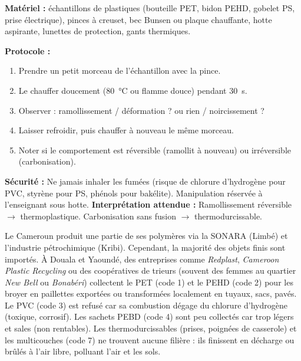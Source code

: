 \documentclass[11pt]{article}
\begin{document}
\begin{experience}
\textbf{Matériel :} échantillons de plastiques (bouteille PET, bidon PEHD, gobelet PS, prise électrique), pinces à creuset, bec Bunsen ou plaque chauffante, hotte aspirante, lunettes de protection, gants thermiques.\par
\textbf{Protocole :}
\begin{enumerate}
\item Prendre un petit morceau de l'échantillon avec la pince.
\item Le chauffer doucement (\SI{80}{\celsius} ou flamme douce) pendant \SI{30}{s}.
\item Observer : ramollissement / déformation ? ou rien / noircissement ?
\item Laisser refroidir, puis chauffer à nouveau le même morceau.
\item Noter si le comportement est réversible (ramollit à nouveau) ou irréversible (carbonisation).
\end{enumerate}
\textbf{Sécurité :} Ne jamais inhaler les fumées (risque de chlorure d'hydrogène pour PVC, styrène pour PS, phénols pour bakélite). Manipulation réservée à l'enseignant sous hotte.
\textbf{Interprétation attendue :} Ramollissement réversible $\rightarrow$ thermoplastique. Carbonisation sans fusion $\rightarrow$ thermodurcissable.
\end{experience}

\begin{savaistu}
Le Cameroun produit une partie de ses polymères via la SONARA (Limbé) et l'industrie pétrochimique (Kribi). Cependant, la majorité des objets finis sont importés. À Douala et Yaoundé, des entreprises comme \emph{Redplast}, \emph{Cameroon Plastic Recycling} ou des coopératives de trieurs (souvent des femmes au quartier \emph{New Bell} ou \emph{Bonabéri}) collectent le PET (code 1) et le PEHD (code 2) pour les broyer en paillettes exportées ou transformées localement en tuyaux, sacs, pavés. Le PVC (code 3) est refusé car sa combustion dégage du chlorure d'hydrogène (toxique, corrosif). Les sachets PEBD (code 4) sont peu collectés car trop légers et sales (non rentables). Les thermodurcissables (prises, poignées de casserole) et les multicouches (code 7) ne trouvent aucune filière : ils finissent en décharge ou brûlés à l'air libre, polluant l'air et les sols.
\end{savaistu}
\end{document}
